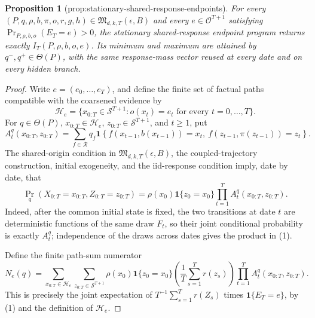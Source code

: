 \documentclass{article}
\newtheorem{proposition}{Proposition}
\begin{document}
\begin{proposition}[prop:stationary-shared-response-endpoints]\label{prop:stationary-shared-response-endpoints}
For every \((P,q,\rho,b,\pi,o,r,g,h)\in\mathfrak M_{d,k,T}(\epsilon,B)\) and every \(e\in\mathcal O^{T+1}\) satisfying \(\Pr_{P,\rho,b,o}(E_T=e)>0\), the stationary shared-response endpoint program returns exactly \(I_T(P,\rho,b,o,e)\). Its minimum and maximum are attained by \(q^-,q^+\in\Theta(P)\), with the same response-mass vector reused at every date and on every hidden branch.
\end{proposition}
\begin{proof}
Write \(e=(e_0,\ldots,e_T)\), and define the finite set of factual paths compatible with the coarsened evidence by
\[
 \mathcal H_e
 =\{x_{0:T}\in\mathcal S^{T+1}:o(x_t)=e_t\text{ for every }t=0,\ldots,T\}.
\]
For \(q\in\Theta(P)\), \(x_{0:T}\in\mathcal H_e\), \(z_{0:T}\in\mathcal S^{T+1}\), and \(t\geq 1\), put
\[
 A_t^q(x_{0:T},z_{0:T})
 =\sum_{f\in\mathcal R}q_f
 \mathbf 1\!\left\{f(x_{t-1},b(x_{t-1}))=x_t,\ 
 f(z_{t-1},\pi(z_{t-1}))=z_t\right\}.
\]
The shared-origin condition in \(\mathfrak M_{d,k,T}(\epsilon,B)\), the coupled-trajectory construction, initial exogeneity, and the iid-response condition imply, date by date, that
\[
 \Pr_q(X_{0:T}=x_{0:T},Z_{0:T}=z_{0:T})
 =\rho(x_0)\mathbf 1\{z_0=x_0\}
   \prod_{t=1}^T A_t^q(x_{0:T},z_{0:T}).                                      \tag{1}
\]
Indeed, after the common initial state is fixed, the two transitions at date \(t\) are deterministic functions of the same draw \(F_t\), so their joint conditional probability is exactly \(A_t^q\); independence of the draws across dates gives the product in (1).

Define the finite path-sum numerator
\[
 N_e(q)=
 \sum_{x_{0:T}\in\mathcal H_e}
 \sum_{z_{0:T}\in\mathcal S^{T+1}}
 \rho(x_0)\mathbf 1\{z_0=x_0\}
 \left(\frac1T\sum_{s=1}^T r(z_s)\right)
 \prod_{t=1}^T A_t^q(x_{0:T},z_{0:T}).                                      \tag{2}
\]
This is precisely the joint expectation of \(T^{-1}\sum_{s=1}^T r(Z_s)\) times \(\mathbf 1\{E_T=e\}\), by (1) and the definition of \(\mathcal H_e\).


\end{proof}
\end{document}
